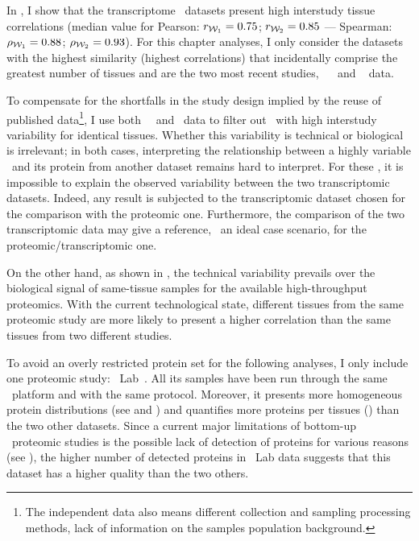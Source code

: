 In , I show that
the transcriptome \Rnaseq\ datasets present high interstudy tissue correlations
(median value for Pearson: $r_{\mathcal{W}_1}=0.75$; $r_{\mathcal{W}_2}=0.85$ ---
Spearman: $\rho_{\mathcal{W}_1}=0.88$; $\rho_{\mathcal{W}_2}=0.93$).
For this chapter analyses,
I only consider the datasets with the highest similarity
(highest correlations)
that incidentally comprise the greatest number of tissues
and are the two most recent studies,
\ie\ ~
and ~ data.\\
\vspace{-\baselineskip}

To compensate for the shortfalls in the study design implied
by the reuse of published data\footnote{%
The independent data also means
different collection and sampling processing methods,
lack of information on the samples population background.},
I use both \uhlen\ \etal\ and \gtex\ data
to filter out \mRNAs\ with high interstudy variability for identical tissues.
Whether this variability is technical or biological is irrelevant;
in both cases,
interpreting the relationship
between a highly variable \mRNAs\ and its protein from another dataset
remains hard to interpret.
For these \mRNAs,
it is impossible to explain the observed variability
between the two transcriptomic datasets.
Indeed, any result is subjected to the transcriptomic dataset chosen
for the comparison with the proteomic one.
Furthermore, the comparison of the two transcriptomic data may give a reference,
\ie\ an ideal case scenario, for the proteomic/transcriptomic one.

On the other hand,
as shown in ,
the technical variability prevails over
the biological signal of same-tissue samples
for the available high-throughput proteomics.
With the current technological state,
different tissues from the same proteomic study are more likely
to present a higher correlation
than the same tissues from two different studies.

To avoid an overly restricted protein set for the following analyses,
I only include one proteomic study: \pandey\ Lab~.
All its samples have been run through the same \ms\ platform and
with the same protocol.
Moreover, it presents more homogeneous protein distributions
(see  and ) and
quantifies more proteins per tissues ()
than the two other datasets.
Since a current major limitations of bottom-up \ms\ proteomic studies
is the possible lack of detection of proteins for various reasons
(see ),
the higher number of detected proteins in \pandey\ Lab data suggests that
this dataset has a higher quality than the two others.

